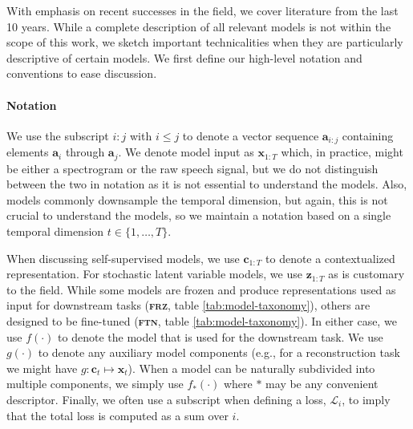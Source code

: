With emphasis on recent successes in the field, we cover literature from the last 10 years. While a complete description of all relevant models is not within the scope of this work, we sketch important technicalities when they are particularly descriptive of certain models. We first define our high-level notation and conventions to ease discussion.





\paragraph{Notation} \label{ssec:notation} We use the subscript $i{:}j$ with $i{\leq}j$ to denote a vector sequence $\textbf{a}_{i:j}$ containing elements $\textbf{a}_{i}$ through $\textbf{a}_{j}$. We denote model input as $\mathbf{x}_{1:T}$ which, in practice, might be either a spectrogram or the raw speech signal, but we do not distinguish between the two in notation as it is not essential to understand the models. Also, models commonly downsample the temporal dimension, but again, this is not crucial to understand the models, so we maintain a notation based on a single temporal dimension $t\in\{1,\dots, T\}$.

When discussing self-supervised models, we use $\mathbf{c}_{1:T}$ to denote a contextualized representation. For stochastic latent variable models, we use $\mathbf{z}_{1:T}$ as is customary to the field. 
While some models are frozen and produce representations used as input for downstream tasks (\textbf{\textsc{frz}}, table \ref{tab:model-taxonomy}), others are designed to be fine-tuned (\textbf{\textsc{ftn}}, table \ref{tab:model-taxonomy}). In either case, we use $f(\cdot)$ to denote the model that is used for the downstream task. We use $g(\cdot)$ to denote any auxiliary model components (e.g., for a reconstruction task we might have $g: \mathbf{c}_t \mapsto \hat{\mathbf{x}}_t$). When a model can be naturally subdivided into multiple components, we simply use $f_*(\cdot)$ where $*$ may be any convenient descriptor. Finally, we often use a subscript when defining a loss, $\mathcal{L}_i$, to imply that the total loss is computed as a sum over $i$.


